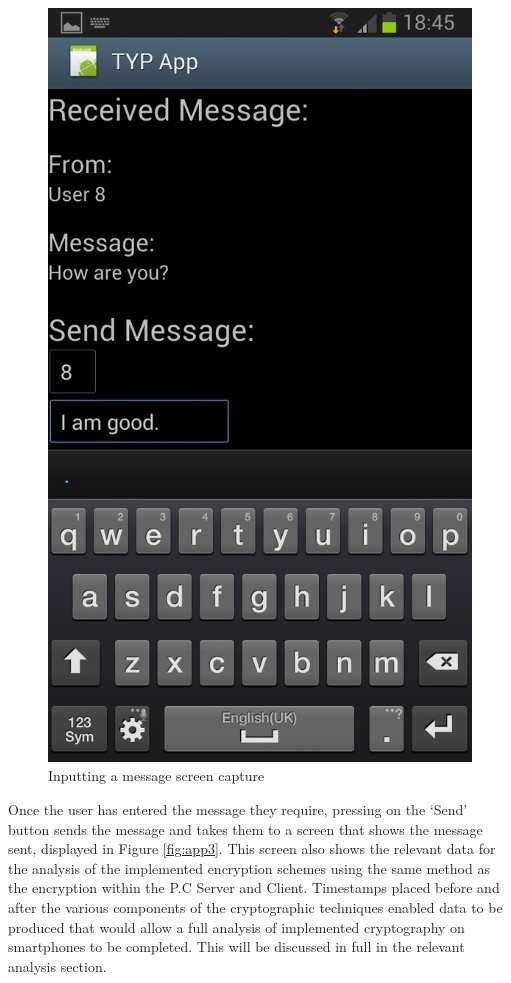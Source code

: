 \documentclass[a4paper,12pt]{report}
\begin{document}
\begin{figure}[htb]
 \centering
 \includegraphics[scale=0.2]{images/screenshots/app2.jpg}
 \caption{Inputting a message screen capture}
 \label{fig:app2}
\end{figure}

Once the user has entered the message they require, pressing on the ‘Send’ button sends the message and takes them to a screen that shows the message sent, displayed in Figure \ref{fig:app3}. This screen also shows the relevant data for the analysis of the implemented encryption schemes using the same method as the encryption within the P.C Server and Client. Timestamps placed before and after the various components of the cryptographic techniques enabled data to be produced that would allow a full analysis of implemented cryptography on smartphones to be completed. This will be discussed in full in the relevant analysis section.
\end{document}
